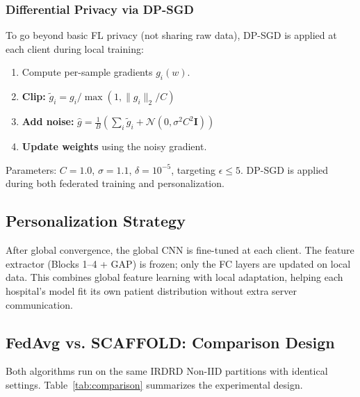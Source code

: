\documentclass[12pt, a4paper]{article}
\begin{document}
\subsubsection{Differential Privacy via DP-SGD}

To go beyond basic FL privacy (not sharing raw data), DP-SGD \cite{p12} is applied at each client during local training:
\begin{enumerate}
  \item Compute per-sample gradients $g_i(w)$.
  \item \textbf{Clip:} $\tilde{g}_i = g_i \big/ \max\left(1, \|g_i\|_2 / C\right)$
  \item \textbf{Add noise:} $\hat{g} = \frac{1}{B}\!\left(\sum_i \tilde{g}_i + \mathcal{N}(0, \sigma^2 C^2 \mathbf{I})\right)$
  \item \textbf{Update weights} using the noisy gradient.
\end{enumerate}

Parameters: $C=1.0$, $\sigma=1.1$, $\delta=10^{-5}$, targeting $\epsilon \leq 5$. DP-SGD is applied during both federated training and personalization.

\subsection{Personalization Strategy}

After global convergence, the global CNN is fine-tuned at each client. The feature extractor (Blocks 1--4 + GAP) is frozen; only the FC layers are updated on local data. This combines global feature learning with local adaptation, helping each hospital's model fit its own patient distribution without extra server communication.

\subsection{FedAvg vs. SCAFFOLD: Comparison Design}

Both algorithms run on the same IRDRD Non-IID partitions with identical settings. Table~\ref{tab:comparison} summarizes the experimental design.
\end{document}
